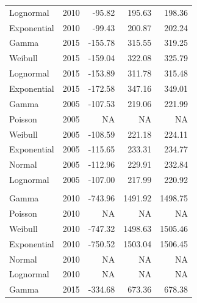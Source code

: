 \documentclass[
11pt, %
oneside, %
english, %
singlespacing, %
]{macthesis} %
\begin{document}
\begin{table}
\begin{tabular}{llrrr}
\hspace{1em}Lognormal & 2010 & -95.82 & 195.63 & 198.36\\
\hspace{1em}Exponential & 2010 & -99.43 & 200.87 & 202.24\\
\hspace{1em}Gamma & 2015 & -155.78 & 315.55 & 319.25\\
\hspace{1em}Weibull & 2015 & -159.04 & 322.08 & 325.79\\
\hspace{1em}Lognormal & 2015 & -153.89 & 311.78 & 315.48\\
\hspace{1em}Exponential & 2015 & -172.58 & 347.16 & 349.01\\
\hspace{1em}Gamma & 2005 & -107.53 & 219.06 & 221.99\\
\hspace{1em}Poisson & 2005 & NA & NA & NA\\
\hspace{1em}Weibull & 2005 & -108.59 & 221.18 & 224.11\\
\hspace{1em}Exponential & 2005 & -115.65 & 233.31 & 234.77\\
\hspace{1em}Normal & 2005 & -112.96 & 229.91 & 232.84\\
\hspace{1em}Lognormal & 2005 & -107.00 & 217.99 & 220.92\\
\addlinespace[0.3em]
\multicolumn{5}{l}{\textbf{Destination: Library}}\\
\hspace{1em}Gamma & 2010 & -743.96 & 1491.92 & 1498.75\\
\hspace{1em}Poisson & 2010 & NA & NA & NA\\
\hspace{1em}Weibull & 2010 & -747.32 & 1498.63 & 1505.46\\
\hspace{1em}Exponential & 2010 & -750.52 & 1503.04 & 1506.45\\
\hspace{1em}Normal & 2010 & NA & NA & NA\\
\hspace{1em}Lognormal & 2010 & NA & NA & NA\\
\hspace{1em}Gamma & 2015 & -334.68 & 673.36 & 678.38\\

\end{tabular}
\end{table}
\end{document}
